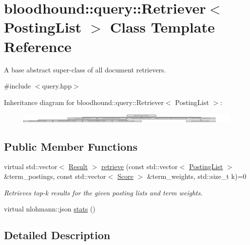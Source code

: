 \hypertarget{classbloodhound_1_1query_1_1Retriever}{}\section{bloodhound\+:\+:query\+:\+:Retriever$<$ Posting\+List $>$ Class Template Reference}
\label{classbloodhound_1_1query_1_1Retriever}


A base abstract super-\/class of all document retrievers.  




{\ttfamily \#include $<$query.\+hpp$>$}

Inheritance diagram for bloodhound\+:\+:query\+:\+:Retriever$<$ Posting\+List $>$\+:\begin{figure}[H]
\begin{center}
\leavevmode
\includegraphics[height=0.484848cm]{classbloodhound_1_1query_1_1Retriever}
\end{center}
\end{figure}
\subsection*{Public Member Functions}
\begin{DoxyCompactItemize}
\item 
virtual std\+::vector$<$ \hyperlink{structbloodhound_1_1query_1_1Result}{Result} $>$ \hyperlink{classbloodhound_1_1query_1_1Retriever_ae3c6a4628c5580e620c213b3dcd47c2b}{retrieve} (const std\+::vector$<$ \hyperlink{classbloodhound_1_1PostingList}{Posting\+List} $>$ \&term\+\_\+postings, const std\+::vector$<$ \hyperlink{structbloodhound_1_1Score}{Score} $>$ \&term\+\_\+weights, std\+::size\+\_\+t k)=0
\begin{DoxyCompactList}\small\item\em Retrieves top-\/k results for the given posting lists and term weights. \end{DoxyCompactList}\item 
virtual nlohmann\+::json \hyperlink{classbloodhound_1_1query_1_1Retriever_a58da32a5139b980ba874f8b5e6bb89ec}{stats} ()
\end{DoxyCompactItemize}


\subsection{Detailed Description}
